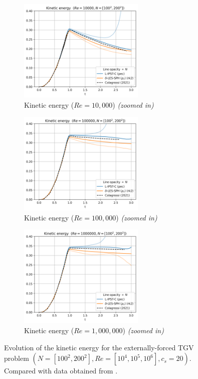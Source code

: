 \begin{figure}[htbp!]
  \begin{subfigure}{7cm}
  \centering\includegraphics[width=6cm]{Code-Figures/ext-force-tgv/limit_ke_re_10000.png}
  \caption{Kinetic energy ($Re = 10,000$) \textit{(zoomed in)}}
  \end{subfigure}
  \begin{subfigure}{7cm}
  \centering\includegraphics[width=6cm]{Code-Figures/ext-force-tgv/limit_ke_re_100000.png}
  \caption{Kinetic energy ($Re = 100,000$) \textit{(zoomed in)}}
  \end{subfigure}
  \begin{subfigure}{7cm}
  \centering\includegraphics[width=6cm]{Code-Figures/ext-force-tgv/limit_ke_re_1000000.png}
  \caption{Kinetic energy ($Re = 1,000,000$) \textit{(zoomed in)}}
  \end{subfigure}
  \caption{Evolution of the kinetic energy for the externally-forced TGV problem $(N=[100^2, 200^2], Re=[10^4, 10^5, 10^6], c_s=20)$. Compared with data obtained from \cite{Antuono_Marrone_Di_Mascio_Colagrossi_2021}.}
  \label{fig:tgv-forced-ke}
\end{figure}


